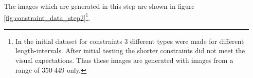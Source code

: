 The images which are generated in this step are shown in figure \ref{fig:constraint_data_step2}\footnote{In the initial dataset for constraints 3 different types were made for different length-intervals. After initial testing the shorter constraints did not meet the visual expectations. Thus these images are generated with images from a range of 350-449 only.}.

\begin{figure}
    \centering
    \begin{subfigure}[b]{0.19\textwidth}
    \end{subfigure}
    \begin{subfigure}[b]{0.19\textwidth}

\end{subfigure}
\end{figure}
